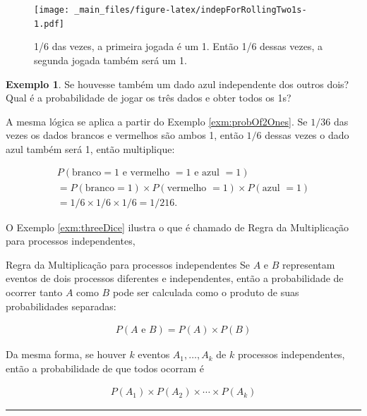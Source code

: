 \documentclass[
]{book}
\theoremstyle{definition}
\theoremstyle{definition}
\newtheorem{example}{Exemplo}[chapter]
\theoremstyle{definition}
\theoremstyle{definition}
\theoremstyle{remark}
\begin{document}
\begin{figure}
\centering
\texttt{[image: \_main\_files/figure-latex/indepForRollingTwo1s-1.pdf]}
\caption{\label{fig:indepForRollingTwo1s}1/6 das vezes, a primeira jogada é um 1. Então 1/6 dessas vezes, a segunda jogada também será um 1.}
\end{figure}

\begin{example}
\protect\hypertarget{exm:threeDice}{}{\label{exm:threeDice} }Se houvesse também um dado azul independente dos outros dois? Qual é a probabilidade de jogar os três dados e obter todos os 1s?
\end{example}

A mesma lógica se aplica a partir do Exemplo \ref{exm:probOf2Ones}. Se \(1/36\) das vezes os dados brancos e vermelhos são ambos 1, então \(1/6\) dessas vezes o dado azul também será 1, então multiplique:

\begin{align*}
P(\text{branco} = 1 \text{ e vermelho } = 1 \text{ e azul } = 1) \\
= P(\text{branco} = 1) \times P(\text{vermelho } = 1) \times P(\text{azul } = 1) \\
= 1/6 \times 1/6 \times 1/6 = 1/216.
\end{align*}

O Exemplo \ref{exm:threeDice} ilustra o que é chamado de Regra da Multiplicação para processos independentes,

Regra da Multiplicação para processos independentes Se \(A\) e \(B\) representam eventos de dois processos diferentes e independentes, então a probabilidade de ocorrer tanto \(A\) como \(B\) pode ser calculada como o produto de suas probabilidades separadas:

\begin{eqnarray}
P(A \text{ e }B) = P(A) \times  P(B)
\label{eq:eqForIndependentEvents}
\end{eqnarray}

Da mesma forma, se houver \(k\) eventos \(A_1,\dots, A_k\) de \(k\) processos independentes, então a probabilidade de que todos ocorram é

\begin{eqnarray*}
P(A_1) \times  P(A_2)\times  \cdots \times  P(A_k)
\end{eqnarray*}

\begin{center}\rule{0.5\linewidth}{0.5pt}\end{center}
\end{document}
